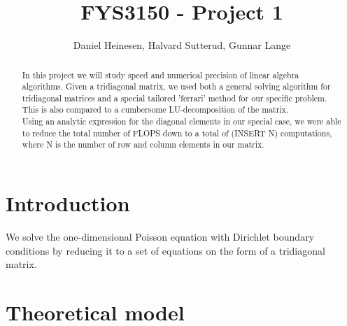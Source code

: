 \documentclass[a4paper, 10pt]{article}
\title{FYS3150 - Project 1}
\author{Daniel Heinesen, Halvard Sutterud, Gunnar Lange}
\begin{document}
\maketitle
\begin{abstract}In this project we will study speed and numerical precision of
    linear algebra algorithms. Given a tridiagonal matrix, we used both a
    general solving algorithm for tridiagonal matrices and a special
    tailored 'ferrari' method for our specific problem. This is also
    compared to a cumbersome LU-decomposition of the matrix.\\
    \linebreak
    Using an analytic expression for the diagonal elements in our special
    case, we were able to reduce the total number of FLOPS down to a total
    of (INSERT N) computations, where N is the number of row and column
    elements in our matrix. 

    

\end{abstract}
\tableofcontents


\section{Introduction }
We solve the one-dimensional Poisson equation with Dirichlet boundary conditions by reducing it to a set of equations on the form of a tridiagonal matrix. 

\section{Theoretical model}\label{Theoretical_section}
\end{document}
